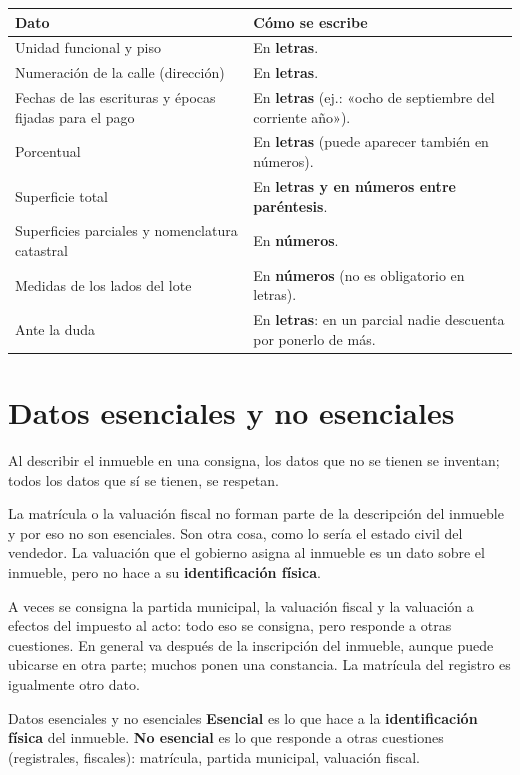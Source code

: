 \documentclass[12pt,oneside]{book}
\begin{document}
\begin{table}[H]
\centering
\begin{tabularx}{\textwidth}{
    >{\raggedright\arraybackslash}p{}
    >{\raggedright\arraybackslash}X
}
\toprule
\textbf{Dato} & \textbf{Cómo se escribe} \\
\midrule
Unidad funcional y piso & En \textbf{letras}. \\
Numeración de la calle (dirección) & En \textbf{letras}. \\
Fechas de las escrituras y épocas fijadas para el pago & En \textbf{letras} (ej.: «ocho de septiembre del corriente año»). \\
Porcentual & En \textbf{letras} (puede aparecer también en números). \\
Superficie total & En \textbf{letras y en números entre paréntesis}. \\
Superficies parciales y nomenclatura catastral & En \textbf{números}. \\
Medidas de los lados del lote & En \textbf{números} (no es obligatorio en letras). \\
Ante la duda & En \textbf{letras}: en un parcial nadie descuenta por ponerlo de más. \\
\bottomrule
\end{tabularx}
\end{table}

\section{Datos esenciales y no esenciales}

Al describir el inmueble en una consigna, los datos que no se tienen se inventan; todos los datos que sí se tienen, se respetan.

La matrícula o la valuación fiscal no forman parte de la descripción del inmueble y por eso no son esenciales. Son otra cosa, como lo sería el estado civil del vendedor. La valuación que el gobierno asigna al inmueble es un dato sobre el inmueble, pero no hace a su \textbf{identificación física}.

A veces se consigna la partida municipal, la valuación fiscal y la valuación a efectos del impuesto al acto: todo eso se consigna, pero responde a otras cuestiones. En general va después de la inscripción del inmueble, aunque puede ubicarse en otra parte; muchos ponen una constancia. La matrícula del registro es igualmente otro dato.

\begin{definition}{Datos esenciales y no esenciales}
\textbf{Esencial} es lo que hace a la \textbf{identificación física} del inmueble. \textbf{No esencial} es lo que responde a otras cuestiones (registrales, fiscales): matrícula, partida municipal, valuación fiscal.
\end{definition}
\end{document}
